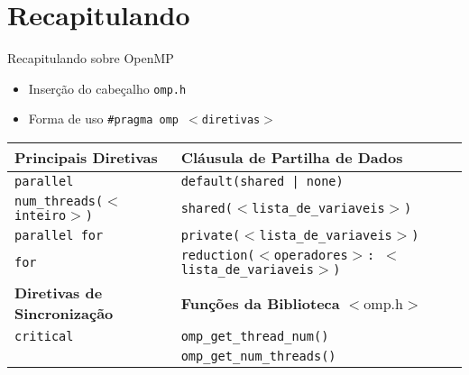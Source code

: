 \section{Recapitulando}
	\begin{frame}[fragile]{Recapitulando sobre OpenMP}
		\begin{itemize}
			\item Inserção do cabeçalho {\tt omp.h}
			\item Forma de uso {\tt \#pragma omp $<$diretivas$>$}
		\end{itemize}
				\pause
		\begin{table}
		    \begin{tabular}{l|l}
		    \hline
		    \textbf{Principais Diretivas}           & \textbf{Cláusula de Partilha de Dados}                             \\ \hline
		    {\tt parallel                } & {\tt default(shared | none)                              } \\
		    {\tt num\_threads($<$inteiro$>$)} & {\tt shared($<$lista\_de\_variaveis$>$)                  } \\
		    {\tt parallel for            } & {\tt private($<$lista\_de\_variaveis$>$)                 } \\
		    {\tt for                     } & {\tt reduction($<$operadores$>$: $<$lista\_de\_variaveis$>$)} \\ \hline \hline

		   \textbf{ Diretivas de Sincronização}     & \textbf{Funções da Biblioteca} $<$omp.h$>$   \\ \hline

			{\tt critical                } & {\tt omp\_get\_thread\_num()      } \\
			{\tt ~                       } & {\tt omp\_get\_num\_threads()     } \\ \hline
		    \end{tabular}
		\end{table}
\end{frame}

